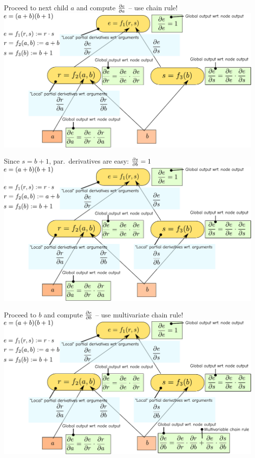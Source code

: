 \documentclass[12pt,aspectratio=169,handout]{beamer}
\begin{document}
\begin{frame}{Proceed to next child $a$ and compute $\pdv{e}{a}$ -- use chain rule!}
	\includegraphics[width=1.2\linewidth]{img/backprop08.pdf}
\end{frame}

\begin{frame}{Since $s = b + 1$, par.\ derivatives are easy: $\pdv{s}{b} = 1$}
	\includegraphics[width=1.2\linewidth]{img/backprop09.pdf}
\end{frame}

\begin{frame}{Proceed to $b$ and compute $\pdv{e}{b}$ -- use multivariate chain rule!}
	\includegraphics[width=1.2\linewidth]{img/backprop10.pdf}
\end{frame}
\end{document}

